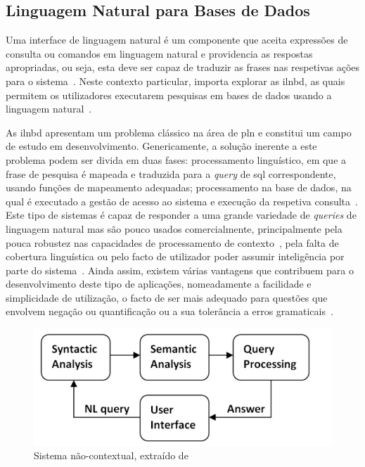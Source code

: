 \subsection{Linguagem Natural para Bases de Dados}

Uma interface de linguagem natural é um componente que aceita expressões de consulta ou comandos em linguagem natural e providencia as respostas apropriadas, ou seja, esta deve ser capaz de traduzir as frases nas respetivas ações para o sistema~\parencite{nlp}. Neste contexto particular, importa explorar as \gls{ilnbd}, as quais permitem os utilizadores executarem pesquisas em bases de dados usando a linguagem natural~\parencite{overview_nlidb_approaches_implementation_airline, novel_approach_building_generic_portable_contextual_nlidb_system}.

As \gls{ilnbd} apresentam um problema clássico na área de \gls{pln} e constitui um campo de estudo em desenvolvimento. Genericamente, a solução inerente a este problema podem ser divida em duas fases: processamento linguístico, em que a frase de pesquisa é mapeada e traduzida para a \textit{query} de \gls{sql} correspondente, usando funções de mapeamento adequadas; processamento na base de dados, na qual é executado a gestão de acesso ao sistema e execução da respetiva consulta~\parencite{overview_nlidb_approaches_implementation_airline}. Este tipo de sistemas é capaz de responder a uma grande variedade de \textit{queries} de linguagem natural mas são pouco usados comercialmente, principalmente pela pouca robustez nas capacidades de processamento de contexto~\parencite{novel_approach_towards_incorporating_context_processing_nlidb}, pela falta de cobertura linguística ou pelo facto de utilizador poder assumir inteligência por parte do sistema~\parencite{survey_nlidb, overview_nlidb_approaches_implementation_airline}. Ainda assim, existem várias vantagens que contribuem para o desenvolvimento deste tipo de aplicações, nomeadamente a facilidade e simplicidade de utilização, o facto de ser mais adequado para questões que envolvem negação ou quantificação ou a sua tolerância a erros gramaticais~\parencite{survey_nlidb, nlidb_brief_review, overview_nlidb_approaches_implementation_airline}.

\begin{figure}[!h]
    \centering
    \includegraphics[width=.6\textwidth]{ch03/assets/non_contextual_nlidb.jpg}
    \caption{Sistema  não-contextual, extraído de~\textcite{novel_approach_towards_incorporating_context_processing_nlidb}}
    \label{fig:noncontextual_nlidb}
\end{figure}

